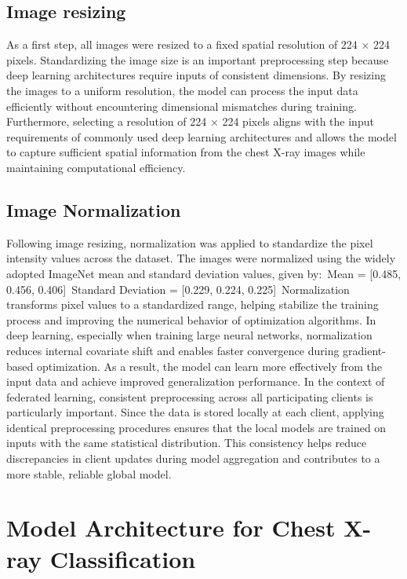 \documentclass[12pt]{book}
\begin{document}
\subsection{Image resizing}
As a first step, all images were resized to a fixed spatial resolution of 224 × 224 pixels. Standardizing the image size is an important preprocessing step because deep learning architectures require inputs of consistent dimensions. By resizing the images to a uniform resolution, the model can process the input data efficiently without encountering dimensional mismatches during training. Furthermore, selecting a resolution of 224 × 224 pixels aligns with the input requirements of commonly used deep learning architectures and allows the model to capture sufficient spatial information from the chest X-ray images while maintaining computational efficiency.

\subsection{Image Normalization}

Following image resizing, normalization was applied to standardize the pixel intensity values across the dataset. The images were normalized using the widely adopted ImageNet mean and standard deviation values, given by:\
Mean = [0.485, 0.456, 0.406]\
Standard Deviation = [0.229, 0.224, 0.225]\
Normalization transforms pixel values to a standardized range, helping stabilize the training process and improving the numerical behavior of optimization algorithms. In deep learning, especially when training large neural networks, normalization reduces internal covariate shift and enables faster convergence during gradient-based optimization. As a result, the model can learn more effectively from the input data and achieve improved generalization performance.
In the context of federated learning, consistent preprocessing across all participating clients is particularly important. Since the data is stored locally at each client, applying identical preprocessing procedures ensures that the local models are trained on inputs with the same statistical distribution. This consistency helps reduce discrepancies in client updates during model aggregation and contributes to a more stable, reliable global model.

\section{ Model Architecture for Chest X-ray Classification}
\end{document}

